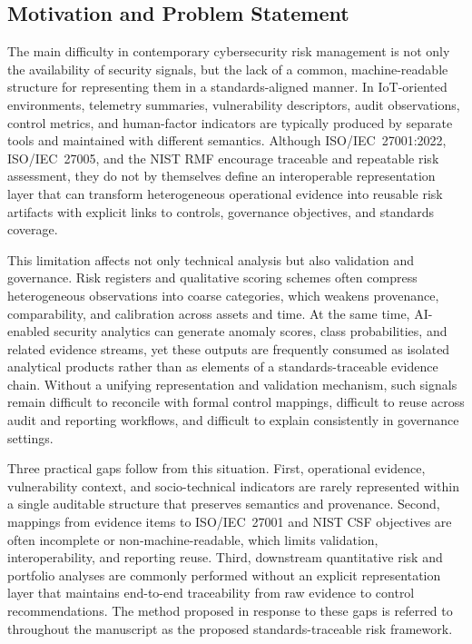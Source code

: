 \documentclass[preprint,12pt]{elsarticle}
\begin{document}
\subsection{Motivation and Problem Statement}
\label{sec:intro-motivation}
\label{sec:intro-problem}

The main difficulty in contemporary cybersecurity risk management is not only the availability of security signals, but the lack of a common, machine-readable structure for representing them in a standards-aligned manner. In IoT-oriented environments, telemetry summaries, vulnerability descriptors, audit observations, control metrics, and human-factor indicators are typically produced by separate tools and maintained with different semantics. Although ISO/IEC~27001:2022, ISO/IEC~27005, and the NIST RMF encourage traceable and repeatable risk assessment, they do not by themselves define an interoperable representation layer that can transform heterogeneous operational evidence into reusable risk artifacts with explicit links to controls, governance objectives, and standards coverage.

This limitation affects not only technical analysis but also validation and governance. Risk registers and qualitative scoring schemes often compress heterogeneous observations into coarse categories, which weakens provenance, comparability, and calibration across assets and time. At the same time, AI-enabled security analytics can generate anomaly scores, class probabilities, and related evidence streams, yet these outputs are frequently consumed as isolated analytical products rather than as elements of a standards-traceable evidence chain. Without a unifying representation and validation mechanism, such signals remain difficult to reconcile with formal control mappings, difficult to reuse across audit and reporting workflows, and difficult to explain consistently in governance settings.

Three practical gaps follow from this situation. First, operational evidence, vulnerability context, and socio-technical indicators are rarely represented within a single auditable structure that preserves semantics and provenance. Second, mappings from evidence items to ISO/IEC~27001 and NIST CSF objectives are often incomplete or non-machine-readable, which limits validation, interoperability, and reporting reuse. Third, downstream quantitative risk and portfolio analyses are commonly performed without an explicit representation layer that maintains end-to-end traceability from raw evidence to control recommendations. The method proposed in response to these gaps is referred to throughout the manuscript as the proposed standards-traceable risk framework.
\end{document}
